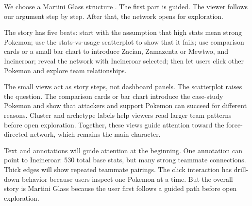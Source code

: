 \documentclass[11pt]{article}
\begin{document}
We choose a Martini Glass structure \cite{segel2010narrative}. The first part is guided. The viewer follows our argument step by step. After that, the network opens for exploration.

The story has five beats: start with the assumption that high stats mean strong Pokemon; use the stats-vs-usage scatterplot to show that it fails; use comparison cards or a small bar chart to introduce Zacian, Zamazenta or Mewtwo, and Incineroar; reveal the network with Incineroar selected; then let users click other Pokemon and explore team relationships.

The small views act as story steps, not dashboard panels. The scatterplot raises the question. The comparison cards or bar chart introduce the case-study Pokemon and show that attackers and support Pokemon can succeed for different reasons. Cluster and archetype labels help viewers read larger team patterns before open exploration. Together, these views guide attention toward the force-directed network, which remains the main character.

Text and annotations will guide attention at the beginning. One annotation can point to Incineroar: 530 total base stats, but many strong teammate connections. Thick edges will show repeated teammate pairings. The click interaction has drill-down behavior because users inspect one Pokemon at a time. But the overall story is Martini Glass because the user first follows a guided path before open exploration.

\newpage
\raggedright


\end{document}
